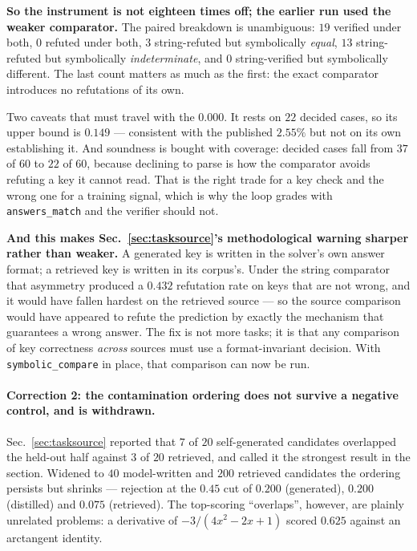 \textbf{So the instrument is not eighteen times off; the earlier run used the weaker
comparator.} The paired breakdown is unambiguous: $19$ verified under both, $0$ refuted under
both, $3$ string-refuted but symbolically \emph{equal}, $13$ string-refuted but symbolically
\emph{indeterminate}, and $0$ string-verified but symbolically different. The last count
matters as much as the first: the exact comparator introduces no refutations of its own.

Two caveats that must travel with the $0.000$. It rests on $22$ decided cases, so its upper
bound is $0.149$ --- consistent with the published $2.55\%$ but not on its own establishing it.
And soundness is bought with coverage: decided cases fall from $37$ of $60$ to $22$ of $60$,
because declining to parse is how the comparator avoids refuting a key it cannot read. That is
the right trade for a key check and the wrong one for a training signal, which is why the loop
grades with \texttt{answers\_match} and the verifier should not.

\textbf{And this makes Sec.~\ref{sec:tasksource}'s methodological warning sharper rather than
weaker.} A generated key is written in the solver's own answer format; a retrieved key is
written in its corpus's. Under the string comparator that asymmetry produced a $0.432$
refutation rate on keys that are not wrong, and it would have fallen hardest on the retrieved
source --- so the source comparison would have appeared to refute the prediction by exactly the
mechanism that guarantees a wrong answer. The fix is not more tasks; it is that any comparison
of key correctness \emph{across} sources must use a format-invariant decision. With
\texttt{symbolic\_compare} in place, that comparison can now be run.

\paragraph{Correction 2: the contamination ordering does not survive a negative control, and
is withdrawn.} Sec.~\ref{sec:tasksource} reported that $7$ of $20$ self-generated candidates
overlapped the held-out half against $3$ of $20$ retrieved, and called it the strongest result
in the section. Widened to $40$ model-written and $200$ retrieved candidates the ordering
persists but shrinks --- rejection at the $0.45$ cut of $0.200$ (generated), $0.200$
(distilled) and $0.075$ (retrieved). The top-scoring ``overlaps'', however, are plainly
unrelated problems: a derivative of $-3/(4x^2-2x+1)$ scored $0.625$ against an arctangent
identity.

